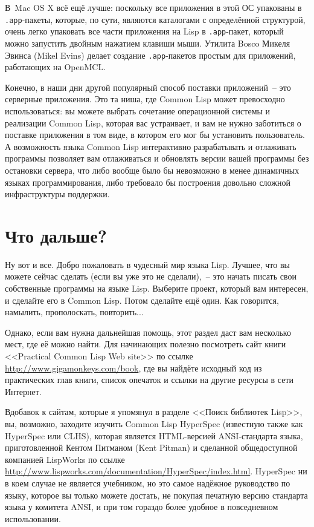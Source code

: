 В~Mac OS X всё ещё лучше: поскольку все приложения в этой ОС упакованы в \texttt{.app}-пакеты,
которые, по сути, являются каталогами с определённой структурой, очень легко упаковать все
части приложения на Lisp в \texttt{.app}-пакет, который можно запустить двойным нажатием клавиши
мыши. Утилита Bosco Микеля Эвинса (Mikel Evins) делает создание \texttt{.app}-пакетов простым для
приложений, работающих на OpenMCL.

Конечно, в наши дни другой популярный способ поставки приложений~-- это серверные
приложения. Это та ниша, где Common Lisp может превосходно использоваться: вы можете
выбрать сочетание операционной системы и реализации Common Lisp, которая вас устраивает, и
вам не нужно заботиться о поставке приложения в том виде, в котором его мог бы установить
пользователь. А возможность языка Common Lisp интерактивно разрабатывать и отлаживать
программы позволяет вам отлаживаться и обновлять версии вашей программы без остановки
сервера, что либо вообще было бы невозможно в менее динамичных языках программирования,
либо требовало бы построения довольно сложной инфраструктуры поддержки.

\section{Что дальше?}

Ну вот и все. Добро пожаловать в чудесный мир языка Lisp. Лучшее, что вы можете сейчас
сделать (если вы уже это не сделали),~-- это начать писать свои собственные программы на
языке Lisp. Выберите проект, который вам интересен, и сделайте его в Common Lisp. Потом
сделайте ещё один. Как говорится, намылить, прополоскать, повторить...

Однако, если вам нужна дальнейшая помощь, этот раздел даст вам несколько мест, где её
можно найти. Для начинающих полезно посмотреть сайт книги <<Practical Common Lisp Web
site>> по ссылке \url{http://www.gigamonkeys.com/book}, где вы найдёте исходный код из
практических глав книги, список опечаток и ссылки на другие ресурсы в сети Интернет.

Вдобавок к сайтам, которые я упомянул в разделе <<Поиск библиотек Lisp>>, вы, возможно,
заходите изучить Common Lisp HyperSpec (известную также как HyperSpec или CLHS), которая
является HTML-версией ANSI-стандарта языка, приготовленной Кентом Питманом (Kent Pitman) и
сделанной общедоступной компанией LispWorks по ссылке
\url{http://www.lispworks.com/documentation/HyperSpec/index.html}. HyperSpec ни в коем
случае не является учебником, но это самое надёжное руководство по языку, которое вы
только можете достать, не покупая печатную версию стандарта языка у комитета ANSI, и при
том гораздо более удобное в повседневном использовании.

